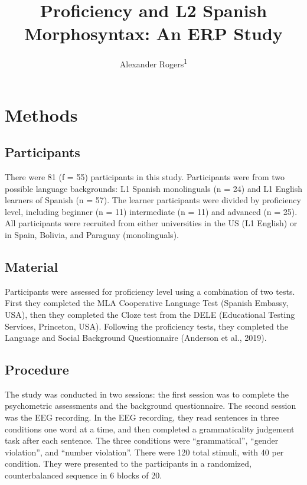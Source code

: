 \documentclass[
  man,floatsintext]{apa6}
\title{Proficiency and L2 Spanish Morphosyntax: An ERP Study}
\author{Alexander Rogers\textsuperscript{1}}
\date{}
\affiliation{\vspace{0.5cm}\textsuperscript{1} Rutgers University, New Brunswick}
\begin{document}
\maketitle

\section{Methods}\label{methods}

\subsection{Participants}\label{participants}

There were 81 (f = 55) participants in this study. Participants were from two possible language backgrounds: L1 Spanish monolinguals (n = 24) and L1 English learners of Spanish (n = 57). The learner participants were divided by proficiency level, including beginner (n = 11) intermediate (n = 11) and advanced (n = 25). All participants were recruited from either universities in the US (L1 English) or in Spain, Bolivia, and Paraguay (monolinguals).

\subsection{Material}\label{material}

Participants were assessed for proficiency level using a combination of two tests. First they completed the MLA Cooperative Language Test (Spanish Embassy, USA), then they completed the Cloze test from the DELE (Educational Testing Services, Princeton, USA). Following the proficiency tests, they completed the Language and Social Background Questionnaire (Anderson et al., 2019).

\subsection{Procedure}\label{procedure}

The study was conducted in two sessions: the first session was to complete the psychometric assessments and the background questionnaire. The second session was the EEG recording. In the EEG recording, they read sentences in three conditions one word at a time, and then completed a grammaticality judgement task after each sentence. The three conditions were ``grammatical'', ``gender violation'', and ``number violation''. There were 120 total stimuli, with 40 per condition. They were presented to the participants in a randomized, counterbalanced sequence in 6 blocks of 20.
\end{document}
